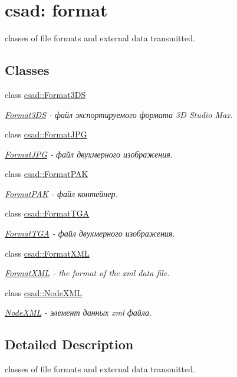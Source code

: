 \hypertarget{group__format}{\section{csad\-: format}
\label{group__format}
}


classes of file formats and external data transmitted.  


\subsection*{Classes}
\begin{DoxyCompactItemize}
\item 
class \hyperlink{classcsad_1_1_format3_d_s}{csad\-::\-Format3\-D\-S}
\begin{DoxyCompactList}\small\item\em \hyperlink{classcsad_1_1_format3_d_s}{Format3\-D\-S} -\/ файл экспортируемого формата 3\-D Studio Max. \end{DoxyCompactList}\item 
class \hyperlink{classcsad_1_1_format_j_p_g}{csad\-::\-Format\-J\-P\-G}
\begin{DoxyCompactList}\small\item\em \hyperlink{classcsad_1_1_format_j_p_g}{Format\-J\-P\-G} -\/ файл двухмерного изображения. \end{DoxyCompactList}\item 
class \hyperlink{classcsad_1_1_format_p_a_k}{csad\-::\-Format\-P\-A\-K}
\begin{DoxyCompactList}\small\item\em \hyperlink{classcsad_1_1_format_p_a_k}{Format\-P\-A\-K} -\/ файл контейнер. \end{DoxyCompactList}\item 
class \hyperlink{classcsad_1_1_format_t_g_a}{csad\-::\-Format\-T\-G\-A}
\begin{DoxyCompactList}\small\item\em \hyperlink{classcsad_1_1_format_t_g_a}{Format\-T\-G\-A} -\/ файл двухмерного изображения. \end{DoxyCompactList}\item 
class \hyperlink{classcsad_1_1_format_x_m_l}{csad\-::\-Format\-X\-M\-L}
\begin{DoxyCompactList}\small\item\em \hyperlink{classcsad_1_1_format_x_m_l}{Format\-X\-M\-L} -\/ the format of the xml data file. \end{DoxyCompactList}\item 
class \hyperlink{classcsad_1_1_node_x_m_l}{csad\-::\-Node\-X\-M\-L}
\begin{DoxyCompactList}\small\item\em \hyperlink{classcsad_1_1_node_x_m_l}{Node\-X\-M\-L} -\/ элемент данных xml файла. \end{DoxyCompactList}\end{DoxyCompactItemize}


\subsection{Detailed Description}
classes of file formats and external data transmitted. 